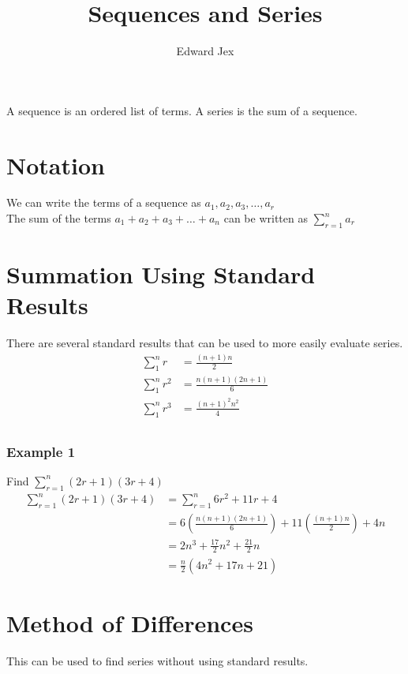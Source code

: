 \documentclass[a4paper,12pt]{article}
\begin{document}
\title{Sequences and Series}	
\author{Edward Jex}
\maketitle
A sequence is an ordered list of terms. A series is the sum of a sequence. 
\section*{Notation}
We can write the terms of a sequence as $a_1, a_2, a_3, \dots, a_r$ \\
The sum of the terms $a_1 + a_2 + a_3 + \dots + a_n$ can be written as $\sum_{r=1}^n a_r$ \\

\section*{Summation Using Standard Results}
There are several standard results that can be used to more easily evaluate series. \\
\begin{align*}
\sum_1^n r   & = \frac{(n+1)n}{2} \\
\sum_1^n r^2 & = \frac{n(n+1)(2n+1)}{6} \\
\sum_1^n r^3 & = \frac{(n+1)^2n^2}{4} \\
\end{align*}
\subsubsection*{Example 1}
Find $\sum^n_{r=1}(2r+1)(3r+4)$
\begin{align*}
\sum^n_{r=1}(2r+1)(3r+4) &= \sum^n_{r=1} 6r^2 + 11r + 4 \\
& = 6(\frac{n(n+1)(2n+1)}{6}) + 11(\frac{(n+1)n}{2}) + 4n \\
& = 2n^3 + \frac{17}{2}n^2 + \frac{21}{2} n \\
& = \frac{n}{2}(4n^2 + 17n + 21)
\end{align*}

\section*{Method of Differences}
This can be used to find series without using standard results. 
\end{document}
